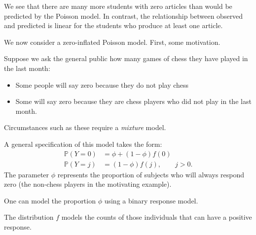 \documentclass[
  ignorenonframetext,
]{beamer}
\providecommand{\tightlist}{%
  \setlength{\itemsep}{0pt}\setlength{\parskip}{0pt}}
\begin{document}
\begin{frame}{}
\protect\hypertarget{section-40}{}
We see that there are many more students with zero articles than would
be predicted by the Poisson model. In contrast, the relationship between
observed and predicted is linear for the students who produce at least
one article.

\vspace{12pt}

We now consider a zero-inflated Poisson model. First, some motivation.

\vspace{12pt}

Suppose we ask the general public how many games of chess they have
played in the last month:

\begin{itemize}
\tightlist
\item
  Some people will say zero because they do not play chess
\item
  Some will say zero because they are chess players who did not play in
  the last month.
\end{itemize}

\vspace{12pt}

Circumstances such as these require a \emph{mixture} model.
\end{frame}

\begin{frame}{}
\protect\hypertarget{section-41}{}
A general specification of this model takes the form: \begin{align*}
  \mathbb{P}(Y = 0) &= \phi + (1 - \phi)f(0) \\
  \mathbb{P}(Y = j) &= (1 - \phi)f(j), \qquad j > 0.
\end{align*} The parameter \(\phi\) represents the proportion of
subjects who will always respond zero (the non-chess players in the
motivating example).

\vspace{12pt}

One can model the proportion \(\phi\) using a binary response model.

\vspace{12pt}

The distribution \(f\) models the counts of those individuals that can
have a positive response.
\end{frame}
\end{document}
